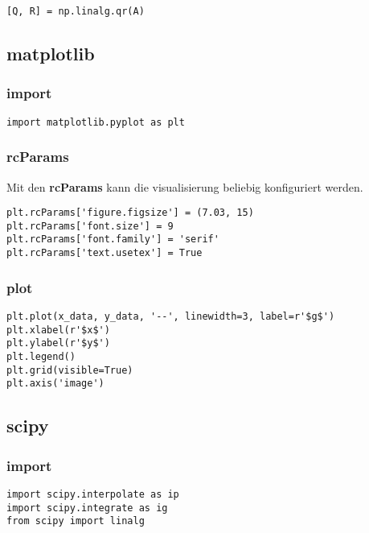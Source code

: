 \begin{verbatim}
[Q, R] = np.linalg.qr(A)
\end{verbatim}

\subsection{matplotlib}

\subsubsection{import}

\begin{verbatim}
import matplotlib.pyplot as plt
\end{verbatim}

\subsubsection{rcParams}

Mit den \textbf{rcParams} kann die visualisierung beliebig konfiguriert werden.

\begin{verbatim}
plt.rcParams['figure.figsize'] = (7.03, 15)
plt.rcParams['font.size'] = 9
plt.rcParams['font.family'] = 'serif'
plt.rcParams['text.usetex'] = True
\end{verbatim}

\subsubsection{plot}

\begin{verbatim}
plt.plot(x_data, y_data, '--', linewidth=3, label=r'$g$')
plt.xlabel(r'$x$')
plt.ylabel(r'$y$')
plt.legend()
plt.grid(visible=True)
plt.axis('image')
\end{verbatim}

\subsection{scipy}

\subsubsection{import}

\begin{verbatim}
import scipy.interpolate as ip
import scipy.integrate as ig
from scipy import linalg
\end{verbatim}

